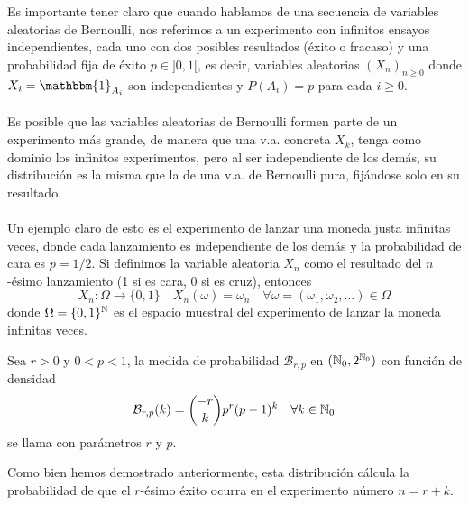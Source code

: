 \noindent
Es importante tener claro que cuando hablamos de una secuencia de variables aleatorias de Bernoulli, nos referimos a un experimento con infinitos ensayos independientes, cada uno con dos posibles resultados (éxito o fracaso) y una probabilidad fija de éxito $p\in]0,1[$, es decir, variables aleatorias $(X_n)_{n\geq 0}$ donde $X_i=\mathbbm{1}_{A_i}$ son independientes y $P(A_i)=p$ para cada $i\geq 0$. \\ \\
\noindent
Es posible que las variables aleatorias de Bernoulli formen parte de un experimento más grande, de manera que una v.a. concreta $X_k$, tenga como dominio los infinitos experimentos, pero al ser independiente de los demás, su distribución es la misma que la de una v.a. de Bernoulli pura, fijándose solo en su resultado. \\ \\
\noindent
Un ejemplo claro de esto es el experimento de lanzar una moneda justa infinitas veces, donde cada lanzamiento es independiente de los demás y la probabilidad de cara es $p=1/2$. Si definimos la variable aleatoria $X_n$ como el resultado del $n$-ésimo lanzamiento (1 si es cara, 0 si es cruz), entonces 
$$ X_n:\Omega \to \{0,1\} \quad X_n(\omega) = \omega_n \quad \forall \omega=(\omega_1, \omega_2, \ldots) \in \Omega $$
donde $\Omega=\{0,1\}^{\mathbb{N}}$ es el espacio muestral del experimento de lanzar la moneda infinitas veces.

\begin{definicion}
    Sea $r>0$ y $0<p<1$, la medida de probabilidad $\mathcal{B}_{r,p}$ en $(\mathbb{N}_0, 2^{\mathbb{N}_0})$ con función de densidad
    \begin{equation*}
        \mathcal{B}_{r,p}(k) = \binom{-r}{k} p^r (p-1)^k \quad \forall k \in \mathbb{N}_0
    \end{equation*}
    se llama  con parámetros $r$ y $p$.
\end{definicion}
\begin{observacion}
    Como bien hemos demostrado anteriormente, esta distribución cálcula la probabilidad de que el $r$-ésimo éxito ocurra en el experimento número $n=r+k$.
\end{observacion}

